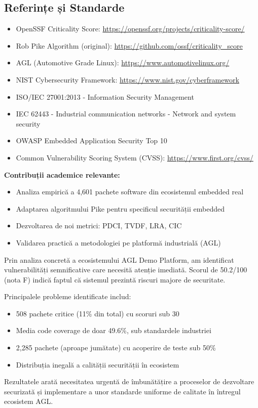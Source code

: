 \documentclass[12pt,a4paper]{article}
\begin{document}
\subsection{Referințe și Standarde}

\begin{itemize}
\item OpenSSF Criticality Score: \url{https://openssf.org/projects/criticality-score/}
\item Rob Pike Algorithm (original): \url{https://github.com/ossf/criticality_score}
\item AGL (Automotive Grade Linux): \url{https://www.automotivelinux.org/}
\item NIST Cybersecurity Framework: \url{https://www.nist.gov/cyberframework}
\item ISO/IEC 27001:2013 - Information Security Management
\item IEC 62443 - Industrial communication networks - Network and system security
\item OWASP Embedded Application Security Top 10
\item Common Vulnerability Scoring System (CVSS): \url{https://www.first.org/cvss/}
\end{itemize}

\textbf{Contribuții academice relevante:}
\begin{itemize}
\item Analiza empirică a 4,601 pachete software din ecosistemul embedded real
\item Adaptarea algoritmului Pike pentru specificul securității embedded
\item Dezvoltarea de noi metrici: PDCI, TVDF, LRA, CIC
\item Validarea practică a metodologiei pe platformă industrială (AGL)
\end{itemize}

Prin analiza concretă a ecosistemului AGL Demo Platform, am identificat vulnerabilități semnificative care necesită atenție imediată. Scorul de 50.2/100 (nota F) indică faptul că sistemul prezintă riscuri majore de securitate.

Principalele probleme identificate includ:
\begin{itemize}
\item 508 pachete critice (11\% din total) cu scoruri sub 30
\item Media code coverage de doar 49.6\%, sub standardele industriei
\item 2,285 pachete (aproape jumătate) cu acoperire de teste sub 50\%
\item Distribuția inegală a calității securității în ecosistem
\end{itemize}

Rezultatele arată necesitatea urgentă de îmbunătățire a proceselor de dezvoltare securizată și implementare a unor standarde uniforme de calitate în întregul ecosistem AGL.

\printbibliography[heading=bibintoc, title={Bibliografie}]
\end{document}

